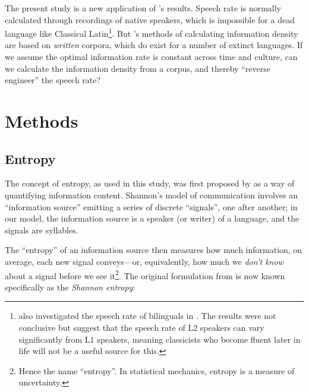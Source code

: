 \documentclass[12pt,twoside]{article}
\begin{document}
The present study is a new application of \citeauthor{coupé}'s results. Speech rate is normally calculated through recordings of native speakers, which is impossible for a dead language like Classical Latin\footnote{\citeauthor{oh} also investigated the speech rate of bilinguals in \cite{ohbilingual}. The results were not conclusive but suggest that the speech rate of L2 speakers can vary significantly from L1 speakers, meaning classicists who become fluent later in life will not be a useful source for this.}. But \citeauthor{oh}'s methods of calculating information density are based on \emph{written} corpora, which do exist for a number of extinct languages. If we assume the optimal information rate is constant across time and culture, can we calculate the information density from a corpus, and thereby ``reverse engineer'' the speech rate?




\section{Methods}
\label{sec:meth}

\subsection{Entropy}
\label{subsec:entropy}

The concept of entropy, as used in this study, was first proposed by \citet{shannon} as a way of quantifying information content. Shannon's model of communication involves an ``information source'' emitting a series of discrete ``signals'', one after another; in our model, the information source is a speaker (or writer) of a language, and the signals are syllables.

The ``entropy'' of an information source then measures how much information, on average, each new signal conveys---or, equivalently, how much we \emph{don't know} about a signal before we see it\footnote{Hence the name ``entropy''. In statistical mechanics, entropy is a measure of uncertainty.}. The original formulation from \citet[50]{shannon} is now known specifically as the \emph{Shannon entropy}:
\end{document}
